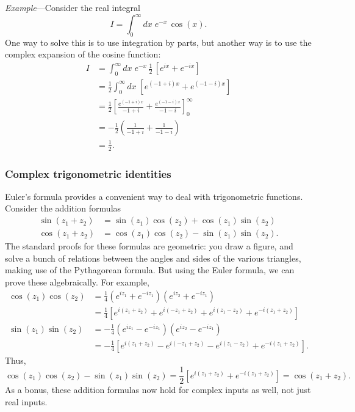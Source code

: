 \documentclass[10pt,a4paper]{article}
\begin{document}
\begin{framed}\noindent
  \textit{Example}---Consider the real integral
  \begin{equation}
    I = \int_0^\infty dx \; e^{- x} \, \cos(x).
  \end{equation}
  One way to solve this is to use integration by parts, but another
  way is to use the complex expansion of the cosine
  function:
  \begin{align}
    I &= \int_0^\infty dx \; e^{- x} \,\frac{1}{2}\,
    \left[e^{ix} + e^{-ix}\right] \\
    &= \frac{1}{2} \int_0^\infty dx \; \left[e^{(-1+i)x} + e^{(-1-i)x}\right] \\
    &= \frac{1}{2} \left[ \frac{e^{(-1+i) x}}{-1+i}
      + \frac{e^{(-1 - i) x}}{-1 - i}\right]_0^\infty
    \\ &= -\frac{1}{2} \left(\frac{1}{-1+i} + \frac{1}{-1 - i}\right)
    \\ &= \frac{1}{2}.
  \end{align}
\end{framed}
    
\subsubsection{Complex trigonometric identities}

Euler's formula provides a convenient way to deal with trigonometric
functions. Consider the addition formulas
\begin{align}
  \sin(z_1 + z_2) &= \sin(z_1) \cos(z_2) + \cos(z_1)\sin(z_2) \\
  \cos(z_1 + z_2) &= \cos(z_1) \cos(z_2) - \sin(z_1)\sin(z_2).
\end{align}
The standard proofs for these formulas are geometric: you draw a
figure, and solve a bunch of relations between the angles and sides of
the various triangles, making use of the Pythagorean formula. But
using the Euler formula, we can prove these algebraically. For
example,
\begin{align}
  \cos(z_1)\cos(z_2)
  &= \frac{1}{4}\left(e^{iz_1} + e^{-iz_1}\right)
  \left(e^{iz_2} + e^{-iz_1}\right)\\
  &= \frac{1}{4}\left[e^{i(z_1+z_2)} + e^{i(-z_1 + z_2)} + e^{i(z_1 -z_2)}
    + e^{-i(z_1+z_2)}\right] \\
  \sin(z_1)\sin(z_2)
  &= -\frac{1}{4}\left(e^{iz_1} - e^{-iz_1}\right)
  \left(e^{iz_2} - e^{-iz_1}\right) \\
  &= -\frac{1}{4}\left[e^{i(z_1+z_2)} - e^{i(-z_1 + z_2)}
    - e^{i(z_1 -z_2)} + e^{-i(z_1+z_2)}\right].
\end{align}
Thus,
\begin{equation}
  \cos(z_1) \cos(z_2) - \sin(z_1)\sin(z_2)
  = \frac{1}{2}\left[e^{i(z_1+z_2)} + e^{-i(z_1+z_2)}\right] = \cos(z_1 + z_2).
\end{equation}
As a bonus, these addition formulas now hold for complex inputs as
well, not just real inputs.
\end{document}
